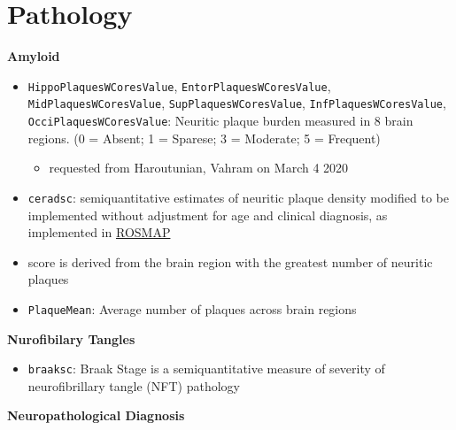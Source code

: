 \documentclass[]{book}
\providecommand{\tightlist}{%
  \setlength{\itemsep}{0pt}\setlength{\parskip}{0pt}}
\begin{document}
\hypertarget{pathology-1}{%
\section{Pathology}\label{pathology-1}}

\textbf{Amyloid}

\begin{itemize}
\tightlist
\item
  \texttt{HippoPlaquesWCoresValue}, \texttt{EntorPlaquesWCoresValue}, \texttt{MidPlaquesWCoresValue}, \texttt{SupPlaquesWCoresValue}, \texttt{InfPlaquesWCoresValue}, \texttt{OcciPlaquesWCoresValue}: Neuritic plaque burden measured in 8 brain regions. (0 = Absent; 1 = Sparese; 3 = Moderate; 5 = Frequent)

  \begin{itemize}
  \tightlist
  \item
    requested from Haroutunian, Vahram on March 4 2020
  \end{itemize}
\item
  \texttt{ceradsc}: semiquantitative estimates of neuritic plaque density modified to be implemented without adjustment for age and clinical diagnosis, as implemented in \href{https://www.radc.rush.edu/docs/var/detail.htm?category=Pathology\&subcategory=Alzheimer\%27s+disease\&variable=ceradsc}{ROSMAP}
\item
  score is derived from the brain region with the greatest number of neuritic plaques
\item
  \texttt{PlaqueMean}: Average number of plaques across brain regions
\end{itemize}

\textbf{Nurofibilary Tangles}

\begin{itemize}
\tightlist
\item
  \texttt{braaksc}: Braak Stage is a semiquantitative measure of severity of neurofibrillary tangle (NFT) pathology
\end{itemize}

\textbf{Neuropathological Diagnosis}
\end{document}
